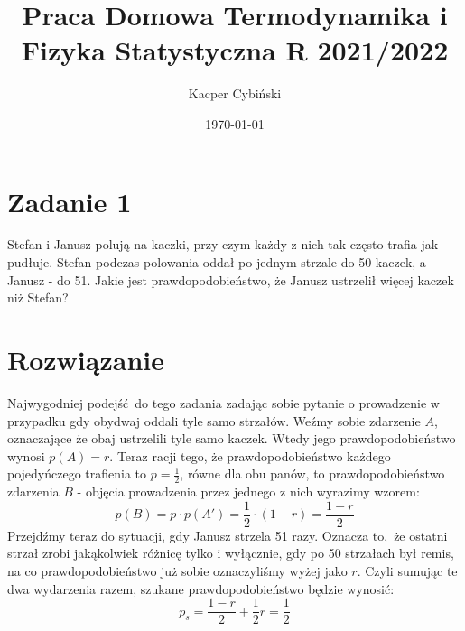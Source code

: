 \documentclass[12pt,a4paper]{article}
\title{Praca Domowa Termodynamika i Fizyka Statystyczna R 2021/2022}
\author{Kacper Cybiński}
\date{\today}
\begin{document}
\maketitle

\section{Zadanie 1}

Stefan i Janusz polują na kaczki, przy czym każdy z nich tak często trafia jak pudłuje. Stefan podczas polowania oddał po jednym strzale do 50 kaczek, a Janusz - do 51. Jakie jest prawdopodobieństwo, że Janusz ustrzelił więcej kaczek niż Stefan?

\section{Rozwiązanie}

Najwygodniej podejść do tego zadania zadając sobie pytanie o prowadzenie w przypadku gdy obydwaj oddali tyle samo strzałów. Weźmy sobie zdarzenie $A$, oznaczające że obaj ustrzelili tyle samo kaczek. Wtedy jego prawdopodobieństwo wynosi $p(A) = r$. Teraz racji tego, że prawdopodobieństwo każdego pojedyńczego trafienia to $p = \frac12$, równe dla obu panów, to prawdopodobieństwo zdarzenia $B$ - objęcia prowadzenia przez jednego z nich wyrazimy wzorem: 
\[
    p(B) = p \cdot p(A') = \frac12 \cdot (1-r) = \frac{1-r}{2}
\]
Przejdźmy teraz do sytuacji, gdy Janusz strzela 51 razy. Oznacza to, że ostatni strzał zrobi jakąkolwiek różnicę tylko i wyłącznie, gdy po 50 strzałach był remis, na co prawdopodobieństwo już sobie oznaczyliśmy wyżej jako $r$. Czyli sumując te dwa wydarzenia razem, szukane prawdopodobieństwo będzie wynosić:
\[
    p_s = \frac{1-r}{2} + \frac12 r = \frac12
\]
\end{document}
